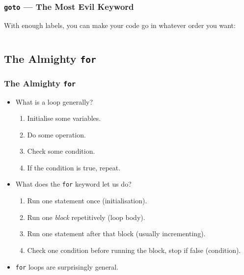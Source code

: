\documentclass[handout,xcolor]{beamer}
\begin{document}
\begin{frame}
	\frametitle{\texttt{goto} --- The Most Evil Keyword}
	\pause
	
	With enough labels, you can make your code go in whatever order you want:
	\pause
	
	\begin{columns}
		\begin{column}{0.45\textwidth}
			\centering
			
		\end{column}
		\pause
		\begin{column}{0.45\textwidth}
			\centering
			
		\end{column}
	\end{columns}
\end{frame}

\subsection{The Almighty \texttt{for}}

\begin{frame}
	\frametitle{The Almighty \texttt{for}}
	\pause
	
	\begin{itemize}
		\item What is a loop generally?
		\pause
		
		\begin{enumerate}
			\item Initialise some variables.
			\pause
			\item Do some operation.
			\pause
			\item Check some condition.
			\pause
			\item If the condition is true, repeat.
		\end{enumerate}
		\pause
		
		\item What does the \texttt{for} keyword let us do?
		\pause
		
		\begin{enumerate}
			\item Run one statement once (initialisation).
			\pause
			\item Run one \textit{block} repetitively (loop body).
			\pause
			\item Run one statement after that block (usually incrementing).
			\pause
			\item Check one condition before running the block, stop if false (condition).
		\end{enumerate}
		\pause
		
		\item \texttt{for} loops are surprisingly general.
	\end{itemize}
\end{frame}
\end{document}
